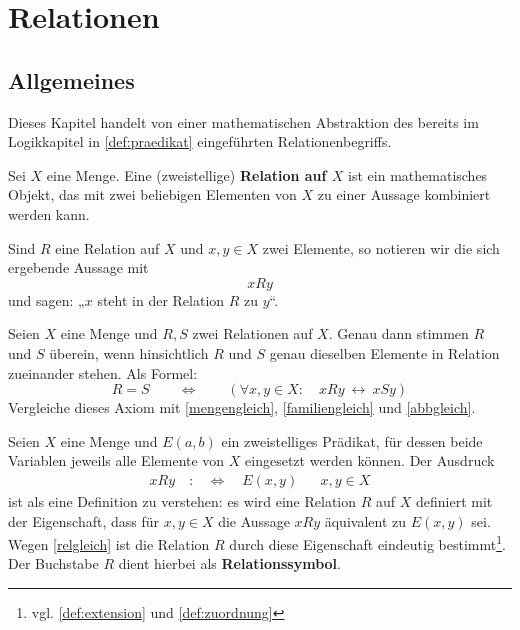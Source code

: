 



\chapter{Relationen} \label{kap:relationen}


\section{Allgemeines}


Dieses Kapitel handelt von einer mathematischen Abstraktion des bereits im Logikkapitel in \cref{def:praedikat} eingeführten Relationenbegriffs.


\begin{defin}[Relation] \label{def:relation} 
    Sei $X$ eine Menge. Eine (zweistellige) \textbf{Relation auf $X$} ist ein mathematisches Objekt, das mit zwei beliebigen Elementen von $X$ zu einer Aussage kombiniert werden kann.

    Sind $R$ eine Relation auf $X$ und $x,y\in X$ zwei Elemente, so notieren wir die sich ergebende Aussage mit
        \[ xRy \]
    und sagen: „$x$ steht in der Relation $R$ zu $y$“.
\end{defin}


\begin{axiom} \label{relgleich}
    Seien $X$ eine Menge und $R,S$ zwei Relationen auf $X$. Genau dann stimmen $R$ und $S$ überein, wenn hinsichtlich $R$ und $S$ genau dieselben Elemente in Relation zueinander stehen. Als Formel:
        \[ R=S \qquad\Leftrightarrow\qquad (\forall x,y\in X:\quad xRy\ \leftrightarrow\ xSy) \]
    Vergleiche dieses Axiom mit \cref{mengengleich}, \cref{familiengleich} und \cref{abbgleich}.
\end{axiom}


\begin{nota}
    Seien $X$ eine Menge und $E(a,b)$ ein zweistelliges Prädikat, für dessen beide Variablen jeweils alle Elemente von $X$ eingesetzt werden können. Der Ausdruck
    \begin{align*}
        xRy \quad :&\Leftrightarrow\quad E(x,y) && x,y\in X
    \end{align*}
    ist als eine Definition zu verstehen: es wird eine Relation $R$ auf $X$ definiert mit der Eigenschaft, dass für $x,y\in X$ die Aussage $xRy$ äquivalent zu $E(x,y)$ sei. Wegen \cref{relgleich} ist die Relation $R$ durch diese Eigenschaft eindeutig bestimmt\footnote{vgl. \cref{def:extension} und \cref{def:zuordnung}}. Der Buchstabe $R$ dient hierbei als \textbf{Relationssymbol}.
\end{nota}


